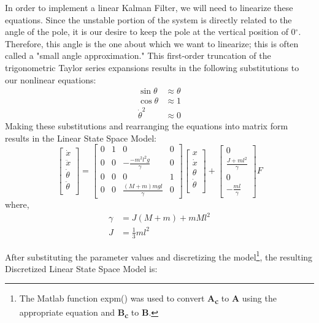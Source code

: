 \documentclass{article}
\begin{document}
In order to implement a linear Kalman Filter, we will need to linearize these equations. Since the unstable portion of the system is directly related to the angle of the pole, it is our desire to keep the pole at the vertical position of 0$^\circ$. Therefore, this angle is the one about which we want to linearize; this is often called a "small angle approximation." This first-order truncation of the trigonometric Taylor series expansions results in the following substitutions to our nonlinear equations:
\begin{align*}
\sin \theta &\approx \theta \\
\cos \theta &\approx 1 \\
\dot{\theta}^2 &\approx 0
\end{align*}
Making these substitutions and rearranging the equations into matrix form results in the Linear State Space Model:
\begin{equation}
\begin{bmatrix}
	\dot{x} \\
	\ddot{x} \\
	\dot{\theta} \\
	\ddot{\theta} \\
\end{bmatrix} = \begin{bmatrix}
0 & 1 & 0 & 0 \\
0 & 0 & -\frac{-m^2l^2g}{\gamma} & 0 \\
0 & 0 & 0 & 1\\
0 & 0 & \frac{(M+m)mgl}{\gamma} & 0
\end{bmatrix} \begin{bmatrix}
	x \\
	\dot{x} \\
	\theta \\
	\dot{\theta} \\
\end{bmatrix}  + \begin{bmatrix}
0 \\
\frac{J+ml^2}{\gamma} \\
0 \\
-\frac{ml}{\gamma}
\end{bmatrix} F
\label{eq:ss_continuous}
\end{equation}
where, 
\begin{align*}
\gamma &= J(M+m)+mMl^2 \\
J &= \frac{1}{3}ml^2
\end{align*}

After substituting the parameter values and discretizing the model\footnote{The Matlab function expm() was used to convert \textbf{A\textsubscript{c}} to \textbf{A} using the appropriate equation and \textbf{B\textsubscript{c}} to \textbf{B}. }, 
the resulting Discretized Linear State Space Model is:
\end{document}
